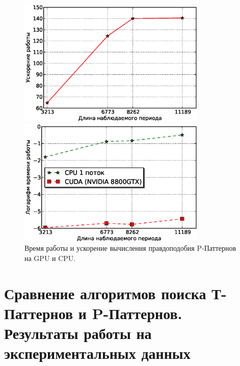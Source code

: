 \documentclass[12pt,fсeqn]{article}
\begin{document}
\begin{figure}[H]
	\begin{multicols}{2}
	\hfill
	\includegraphics[width=90mm]{cuL_su.eps}

	\includegraphics[width=90mm]{cuL_t.eps}
	\end{multicols}
	\caption{Время работы и ускорение вычисления правдоподобия P-Паттернов на GPU и CPU.}
\label{fig:cuda_L}
\end{figure}



\section[Сравнение методов. Результаты работы на реальных данных]{ Сравнение алгоритмов поиска Т-Паттернов и P-Паттернов. Результаты работы на экспериментальных данных}
\end{document}
